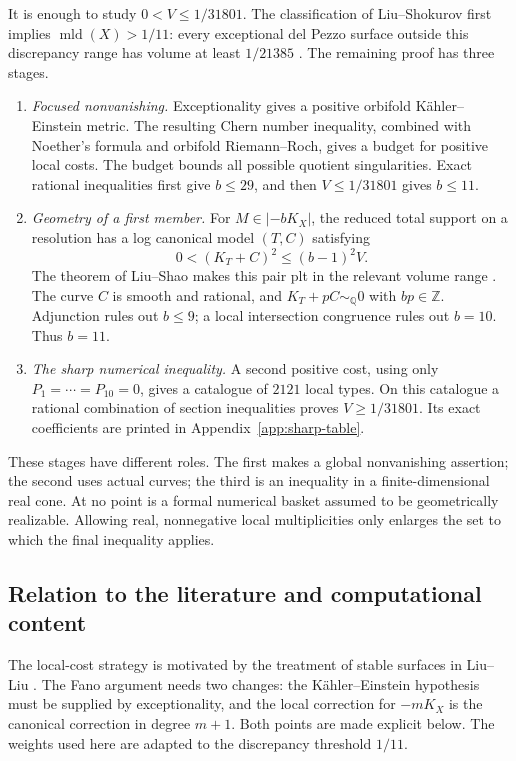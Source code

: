 \documentclass[12pt,a4paper]{article}
\numberwithin{equation}{section}
\theoremstyle{definition}
\newcommand{\Q}{\mathbb Q}
\newcommand{\Z}{\mathbb Z}
\newcommand{\mld}{\operatorname{mld}}
\begin{document}
It is enough to study \(0<V\leq1/31801\).
The classification of Liu--Shokurov first implies
\(\mld(X)>1/11\): every exceptional del Pezzo surface outside this
discrepancy range has volume at least \(1/21385\)
\cite[Theorems 1.9 and 8.8, Table 8]{LS23}.
The remaining proof has three stages.

\begin{enumerate}[label=\textup{(\arabic*)}]
\item \emph{Focused nonvanishing.}
Exceptionality gives a positive orbifold K\"ahler--Einstein metric.
The resulting Chern number inequality, combined with Noether's formula
and orbifold Riemann--Roch, gives a budget for positive local costs.
The budget bounds all possible quotient singularities.
Exact rational inequalities first give \(b\leq29\), and then
\(V\leq1/31801\) gives \(b\leq11\).
\item \emph{Geometry of a first member.}
For \(M\in|-bK_X|\), the reduced total support on a resolution has a
log canonical model \((T,C)\) satisfying
\[
                  0<(K_T+C)^2\leq(b-1)^2V.
\]
The theorem of Liu--Shao makes this pair plt in the relevant volume
range \cite[Theorem 1.3]{LS26}. The curve \(C\) is smooth and rational,
and \(K_T+pC\sim_{\Q}0\) with \(bp\in\Z\).
Adjunction rules out \(b\leq9\); a local intersection congruence rules
out \(b=10\). Thus \(b=11\).
\item \emph{The sharp numerical inequality.}
A second positive cost, using only \(P_1=\cdots=P_{10}=0\), gives a
catalogue of \(2121\) local types. On this catalogue a rational
combination of section inequalities proves \(V\geq1/31801\).
Its exact coefficients are printed in Appendix~\ref{app:sharp-table}.
\end{enumerate}

These stages have different roles. The first makes a global
nonvanishing assertion; the second uses actual curves; the third
is an inequality in a finite-dimensional real cone. At no point is
a formal numerical basket assumed to be geometrically realizable.
Allowing real, nonnegative local multiplicities only enlarges the
set to which the final inequality applies.

\subsection{Relation to the literature and computational content}

The local-cost strategy is motivated by the treatment of stable
surfaces in Liu--Liu \cite[Section 9]{LL26stable}.
The Fano argument needs two changes: the K\"ahler--Einstein hypothesis
must be supplied by exceptionality, and the local correction for
\(-mK_X\) is the canonical correction in degree \(m+1\).
Both points are made explicit below. The weights used here are
adapted to the discrepancy threshold \(1/11\).
\end{document}

